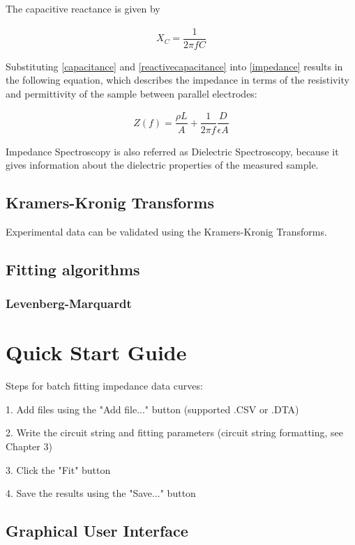 \documentclass[10pt,a4paper,oneside]{book}
\begin{document}
The capacitive reactance is given by

\begin{align}
X_C = \dfrac{1}{2\pi{}fC}	\label{reactivecapacitance}
\end{align}

Substituting \eqref{capacitance} and \eqref{reactivecapacitance} into \eqref{impedance} results in the following equation, which describes the impedance in terms of the resistivity and permittivity of the sample between parallel electrodes:

\begin{align}
Z(f) = \dfrac{\rho L}{A} + \dfrac{1}{2\pi{}f} \dfrac{D}{\epsilon A}
\end{align}

Impedance Spectroscopy is also referred as Dielectric Spectroscopy, because it gives information about the dielectric properties of the measured sample.

\newpage
\section{Kramers-Kronig Transforms}

Experimental data can be validated using the Kramers-Kronig Transforms.


\section{Fitting algorithms}

\subsection{Levenberg-Marquardt}




\chapter{Quick Start Guide}

Steps for batch fitting impedance data curves:

1. Add files using the "Add file..." button (supported .CSV or .DTA)

2. Write the circuit string and fitting parameters (circuit string formatting, see Chapter 3)

3. Click the "Fit" button

4. Save the results using the "Save..." button

\section{Graphical User Interface}
\end{document}
